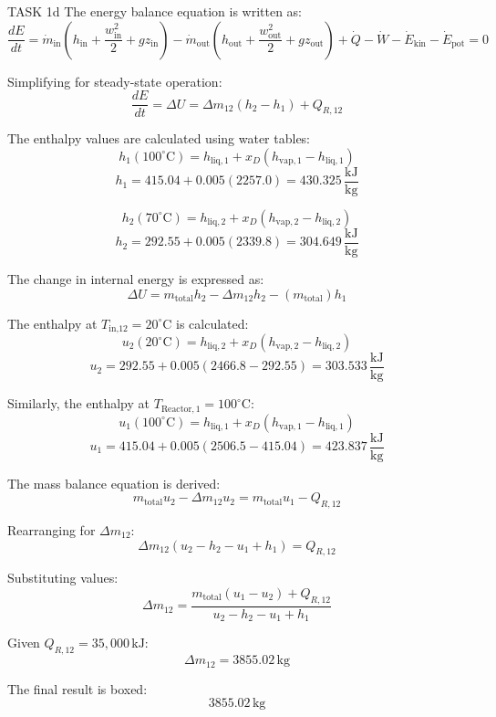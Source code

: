 TASK 1d  
The energy balance equation is written as:  
\[
\frac{dE}{dt} = \dot{m}_{\text{in}} \left( h_{\text{in}} + \frac{w^2_{\text{in}}}{2} + gz_{\text{in}} \right) - \dot{m}_{\text{out}} \left( h_{\text{out}} + \frac{w^2_{\text{out}}}{2} + gz_{\text{out}} \right) + \dot{Q} - \dot{W} - \dot{E}_{\text{kin}} - \dot{E}_{\text{pot}} = 0
\]

Simplifying for steady-state operation:  
\[
\frac{dE}{dt} = \Delta U = \Delta m_{12} (h_2 - h_1) + Q_{R,12}
\]

The enthalpy values are calculated using water tables:  
\[
h_1 (100^\circ\text{C}) = h_{\text{liq},1} + x_D (h_{\text{vap},1} - h_{\text{liq},1})
\]
\[
h_1 = 415.04 + 0.005 (2257.0) = 430.325 \, \frac{\text{kJ}}{\text{kg}}
\]

\[
h_2 (70^\circ\text{C}) = h_{\text{liq},2} + x_D (h_{\text{vap},2} - h_{\text{liq},2})
\]
\[
h_2 = 292.55 + 0.005 (2339.8) = 304.649 \, \frac{\text{kJ}}{\text{kg}}
\]

The change in internal energy is expressed as:  
\[
\Delta U = m_{\text{total}} h_2 - \Delta m_{12} h_2 - (m_{\text{total}}) h_1
\]

The enthalpy at \( T_{\text{in,12}} = 20^\circ\text{C} \) is calculated:  
\[
u_2 (20^\circ\text{C}) = h_{\text{liq},2} + x_D (h_{\text{vap},2} - h_{\text{liq},2})
\]
\[
u_2 = 292.55 + 0.005 (2466.8 - 292.55) = 303.533 \, \frac{\text{kJ}}{\text{kg}}
\]

Similarly, the enthalpy at \( T_{\text{Reactor},1} = 100^\circ\text{C} \):  
\[
u_1 (100^\circ\text{C}) = h_{\text{liq},1} + x_D (h_{\text{vap},1} - h_{\text{liq},1})
\]
\[
u_1 = 415.04 + 0.005 (2506.5 - 415.04) = 423.837 \, \frac{\text{kJ}}{\text{kg}}
\]

The mass balance equation is derived:  
\[
m_{\text{total}} u_2 - \Delta m_{12} u_2 = m_{\text{total}} u_1 - Q_{R,12}
\]

Rearranging for \( \Delta m_{12} \):  
\[
\Delta m_{12} (u_2 - h_2 - u_1 + h_1) = Q_{R,12}
\]

Substituting values:  
\[
\Delta m_{12} = \frac{m_{\text{total}} (u_1 - u_2) + Q_{R,12}}{u_2 - h_2 - u_1 + h_1}
\]

Given \( Q_{R,12} = 35,000 \, \text{kJ} \):  
\[
\Delta m_{12} = 3855.02 \, \text{kg}
\]

The final result is boxed:  
\[
\boxed{3855.02 \, \text{kg}}
\]